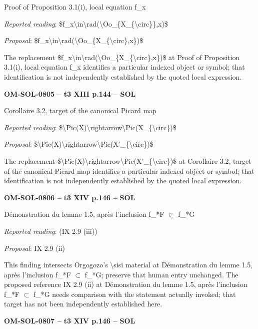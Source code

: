 Proof of Proposition 3.1(i), local equation f\_x\par
\emph{Reported reading}: \$f\_x\textbackslash{}in\textbackslash{}rad(\textbackslash{}Oo\_\{X\_\{\textbackslash{}circ\}\},x)\$\par
\emph{Proposal}: \$f\_x\textbackslash{}in\textbackslash{}rad(\textbackslash{}Oo\_\{X\_\{\textbackslash{}circ\},x\})\$\par
The replacement \$f\_x\textbackslash{}in\textbackslash{}rad(\textbackslash{}Oo\_\{X\_\{\textbackslash{}circ\},x\})\$ at Proof of Proposition 3.1(i), local equation f\_x identifies a particular indexed object or symbol; that identification is not independently established by the quoted local expression.\par
\par\noindent\textbf{OM-SOL-0805 -- t3 XIII p.144 -- SOL}\par
Corollaire 3.2, target of the canonical Picard map\par
\emph{Reported reading}: \$\textbackslash{}Pic(X)\textbackslash{}rightarrow\textbackslash{}Pic(X\_\{\textbackslash{}circ\})\$\par
\emph{Proposal}: \$\textbackslash{}Pic(X)\textbackslash{}rightarrow\textbackslash{}Pic(X'\_\{\textbackslash{}circ\})\$\par
The replacement \$\textbackslash{}Pic(X)\textbackslash{}rightarrow\textbackslash{}Pic(X'\_\{\textbackslash{}circ\})\$ at Corollaire 3.2, target of the canonical Picard map identifies a particular indexed object or symbol; that identification is not independently established by the quoted local expression.\par
\par\noindent\textbf{OM-SOL-0806 -- t3 XIV p.146 -- SOL}\par
Démonstration du lemme 1.5, après l'inclusion f\_*F \ensuremath{\subset} f\_*G\par
\emph{Reported reading}: (IX 2.9 (iii))\par
\emph{Proposal}: IX 2.9 (ii)\par
This finding intersects Orgogozo's \textbackslash{}sisi material at Démonstration du lemme 1.5, après l'inclusion f\_*F \ensuremath{\subset} f\_*G; preserve that human entry unchanged. The proposed reference IX 2.9 (ii) at Démonstration du lemme 1.5, après l'inclusion f\_*F \ensuremath{\subset} f\_*G needs comparison with the statement actually invoked; that target has not been independently established here.\par
\par\noindent\textbf{OM-SOL-0807 -- t3 XIV p.146 -- SOL}\par
